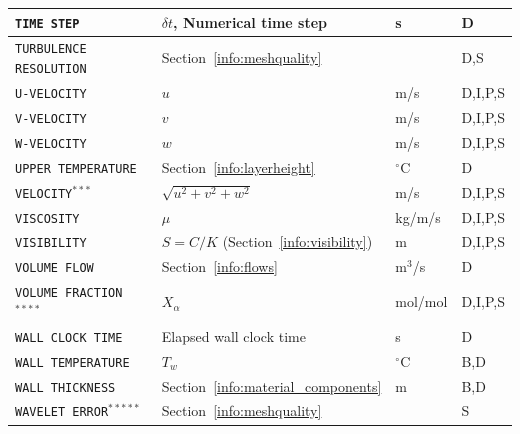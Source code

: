 \documentclass[11pt]{book}
\newcommand{\ct}{\tt\small}
\begin{document}
\begin{longtable}{@{\extracolsep{\fill}}|l|l|l|l|}
{\ct TIME STEP}                                 & $\delta t$, Numerical time step               & s              & D            \\ \hline
{\ct TURBULENCE RESOLUTION}                     & Section~\ref{info:meshquality}                &                & D,S          \\ \hline
{\ct U-VELOCITY}                                & $u$                                           & m/s            & D,I,P,S      \\ \hline
{\ct V-VELOCITY}                                & $v$                                           & m/s            & D,I,P,S      \\ \hline
{\ct W-VELOCITY}                                & $w$                                           & m/s            & D,I,P,S      \\ \hline
{\ct UPPER TEMPERATURE}                         & Section~\ref{info:layerheight}                & $^\circ$C      & D            \\ \hline
{\ct VELOCITY}$^{***}$                          & $\sqrt{u^2+v^2+w^2}$                          & m/s            & D,I,P,S      \\ \hline
{\ct VISCOSITY}                                 & $\mu$                                         & kg/m/s         & D,I,P,S      \\ \hline
{\ct VISIBILITY}                                & $S=C/K$ (Section~\ref{info:visibility})       & m              & D,I,P,S      \\ \hline
{\ct VOLUME FLOW}                               & Section~\ref{info:flows}                      & m$^3$/s        & D            \\ \hline
{\ct VOLUME FRACTION}$^{****}$                  & $X_\alpha$                                    & mol/mol        & D,I,P,S      \\ \hline
{\ct WALL CLOCK TIME}                           & Elapsed wall clock time                       & s              & D            \\ \hline
{\ct WALL TEMPERATURE}                          & $T_w$                                         & $^\circ$C      & B,D          \\ \hline
{\ct WALL THICKNESS}                            & Section~\ref{info:material_components}        & m              & B,D          \\ \hline
{\ct WAVELET ERROR}$^{*****}$                   & Section~\ref{info:meshquality}                &                & S            \\ \hline
\end{longtable}
\end{document}

